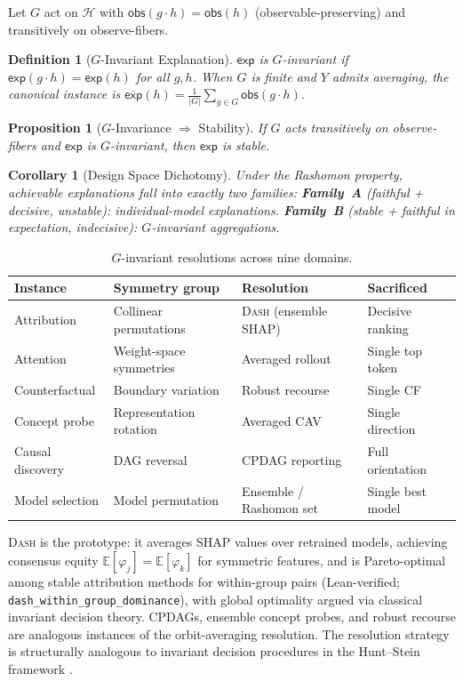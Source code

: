 \documentclass{article}
\newtheorem{corollary}{Corollary}
\newtheorem{definition}{Definition}
\newtheorem{proposition}{Proposition}
\newcommand{\E}{\mathbb{E}}
\newcommand{\DASH}{\textsc{Dash}}
\newcommand{\sH}{\mathcal{H}}
\begin{document}
Let $G$ act on $\sH$ with $\mathsf{obs}(g \cdot h) = \mathsf{obs}(h)$ (observable-preserving) and transitively on observe-fibers.

\begin{definition}[$G$-Invariant Explanation]
$\mathsf{exp}$ is \emph{$G$-invariant} if $\mathsf{exp}(g \cdot h) = \mathsf{exp}(h)$ for all $g, h$.  When $G$ is finite and $Y$ admits averaging, the canonical instance is $\overline{\mathsf{exp}}(h) = \frac{1}{|G|}\sum_{g \in G} \mathsf{obs}(g \cdot h)$.
\end{definition}

\begin{proposition}[$G$-Invariance $\Rightarrow$ Stability]
\label{prop:g-stable}
If $G$ acts transitively on observe-fibers and $\mathsf{exp}$ is $G$-invariant, then $\mathsf{exp}$ is stable.
\end{proposition}

\begin{corollary}[Design Space Dichotomy]
Under the Rashomon property, achievable explanations fall into exactly two families:
\textbf{Family~A} (faithful + decisive, unstable): individual-model explanations.
\textbf{Family~B} (stable + faithful in expectation, indecisive): $G$-invariant aggregations.
\end{corollary}

\begin{table}[t]
\centering
\caption{$G$-invariant resolutions across nine domains.}
\label{tab:resolutions}
\small
\begin{tabular}{@{}llll@{}}
\toprule
Instance & Symmetry group & Resolution & Sacrificed \\
\midrule
Attribution & Collinear permutations & \DASH{} (ensemble SHAP) & Decisive ranking \\
Attention & Weight-space symmetries & Averaged rollout & Single top token \\
Counterfactual & Boundary variation & Robust recourse & Single CF \\
Concept probe & Representation rotation & Averaged CAV & Single direction \\
Causal discovery & DAG reversal & CPDAG reporting & Full orientation \\
Model selection & Model permutation & Ensemble / Rashomon set & Single best model \\
\bottomrule
\end{tabular}
\end{table}

\DASH{} is the prototype: it averages SHAP values over retrained models, achieving consensus equity $\E[\varphi_j] = \E[\varphi_k]$ for symmetric features, and is Pareto-optimal among stable attribution methods for within-group pairs (Lean-verified; \texttt{dash\_within\_group\_dominance}), with global optimality argued via classical invariant decision theory. CPDAGs, ensemble concept probes, and robust recourse are analogous instances of the orbit-averaging resolution. The resolution strategy is structurally analogous to invariant decision procedures in the Hunt--Stein framework \citep{lehmann2005testing}.
\end{document}
